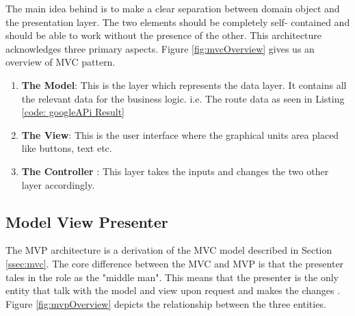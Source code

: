         \par
           The main idea behind is to make a clear separation between domain object and the presentation layer. The two elements should be completely self-
           contained and should be able to work without the presence of the other. This 
           architecture acknowledges three primary aspects. Figure \ref{fig:mvcOverview} 
           gives us an overview of MVC pattern.
           \begin{enumerate}
               \item 
                \textbf{The Model}: This is the layer which represents the data layer. It 
                contains all the relevant data for the business logic. i.e. 
                The route data as seen in Listing \ref{code: googleAPi Result} 

               \item 
                \textbf{The View}: This is the user interface where the graphical units area
                placed like buttons, text etc.

               \item 
                \textbf{The Controller} : This layer takes the inputs and changes the two other
                layer accordingly.
           \end{enumerate} 

        

    \subsection{Model View Presenter}
        The MVP architecture is a derivation of the MVC model described in Section 
        \ref{ssec:mvc}. The core difference between the MVC and MVP is that the presenter
        tales in the role as the "middle man". This means that the presenter is the only
        entity that talk with the model and view upon request and makes the changes
        \cite{Potel}. Figure \ref{fig:mvpOverview} depicts the relationship between the 
        three entities.

